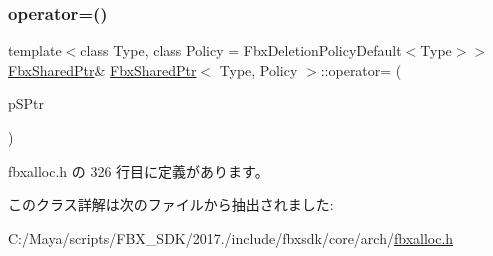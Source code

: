 \subsubsection{\texorpdfstring{operator=()}{operator=()}}
{\footnotesize\ttfamily template$<$class Type, class Policy = Fbx\+Deletion\+Policy\+Default$<$\+Type$>$$>$ \\
\hyperlink{class_fbx_shared_ptr}{Fbx\+Shared\+Ptr}\& \hyperlink{class_fbx_shared_ptr}{Fbx\+Shared\+Ptr}$<$ Type, Policy $>$\+::operator= (\begin{DoxyParamCaption}\item[{const \hyperlink{class_fbx_shared_ptr}{Fbx\+Shared\+Ptr}$<$ Type, Policy $>$ \&}]{p\+S\+Ptr }\end{DoxyParamCaption})\hspace{0.3cm}{\ttfamily [inline]}}



 fbxalloc.\+h の 326 行目に定義があります。



このクラス詳解は次のファイルから抽出されました\+:\begin{DoxyCompactItemize}
\item 
C\+:/\+Maya/scripts/\+F\+B\+X\+\_\+\+S\+D\+K/2017./include/fbxsdk/core/arch/\hyperlink{fbxalloc_8h}{fbxalloc.\+h}\end{DoxyCompactItemize}
